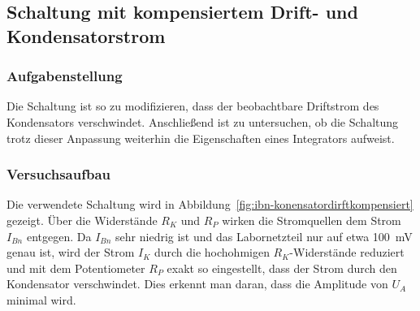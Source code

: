 \subsection{Schaltung mit kompensiertem Drift- und Kondensatorstrom}\label{sec:1-3}
\subsubsection{Aufgabenstellung}
Die Schaltung ist so zu modifizieren, dass der beobachtbare Driftstrom des Kondensators verschwindet. Anschließend ist zu untersuchen, ob die Schaltung trotz dieser Anpassung weiterhin die Eigenschaften eines Integrators aufweist.

\subsubsection{Versuchsaufbau}
Die verwendete Schaltung wird in Abbildung~\ref{fig:ibn-konensatordirftkompensiert} gezeigt. Über die Widerstände $R_K$ und $R_P$ wirken die Stromquellen dem Strom $I_{Bn}$ entgegen. Da $I_{Bn}$ sehr niedrig ist und das Labornetzteil nur auf etwa \SI{100}{\milli\volt} genau ist, wird der Strom $I_K$ durch die hochohmigen $R_K$-Widerstände reduziert und mit dem Potentiometer $R_P$ exakt so eingestellt, dass der Strom durch den Kondensator verschwindet. Dies erkennt man daran, dass die Amplitude von $U_A$ minimal wird.

